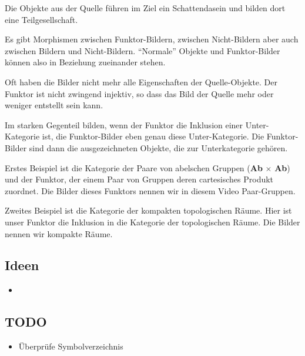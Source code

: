 \documentclass[a4paper]{amsart}
\theoremstyle{definition}
\begin{document}
Die Objekte aus der Quelle führen im Ziel ein Schattendasein und bilden dort eine Teilgesellschaft.

Es gibt Morphismen zwischen Funktor-Bildern, zwischen Nicht-Bildern aber auch zwischen Bildern und Nicht-Bildern. "`Normale"' Objekte und Funktor-Bilder können also in Beziehung zueinander stehen.

Oft haben die Bilder nicht mehr alle Eigenschaften der Quelle-Objekte. Der Funktor ist nicht zwingend injektiv, so dass das Bild der Quelle mehr oder weniger entstellt sein kann.

Im starken Gegenteil bilden, wenn der Funktor die Inklusion einer Unter-Kategorie ist, die Funktor-Bilder eben genau diese Unter-Kategorie. Die Funktor-Bilder sind dann die ausgezeichneten Objekte, die zur Unterkategorie gehören.

Erstes Beispiel ist die Kategorie der Paare von abelschen Gruppen (\textbf{Ab} $\times$ \textbf{Ab}) und der Funktor, der einem Paar von Gruppen deren cartesisches Produkt zuordnet. Die Bilder dieses Funktors nennen wir in diesem Video Paar-Gruppen.

Zweites Beispiel ist die Kategorie der kompakten topologischen Räume. Hier ist unser Funktor die Inklusion in die Kategorie der topologischen Räume. Die Bilder nennen wir kompakte Räume. 

\subsection{Ideen}
\begin{itemize}
   \item 
\end{itemize}

\begin{backup}
\section{TODO}

\begin{itemize}
     \item Überprüfe Symbolverzeichnis
\end{itemize}

\end{backup}
\end{document}
